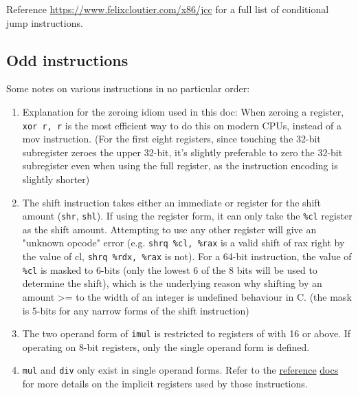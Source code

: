 \documentclass[11pt]{article}
\begin{document}
Reference \href{this link}{https://www.felixcloutier.com/x86/jcc} for a full list of
conditional jump instructions.

\subsection{Odd instructions}

Some notes on various instructions in no particular order:

\begin{enumerate}
    \item Explanation for the zeroing idiom used in this doc: When zeroing a register,
        \texttt{xor r, r} is the most efficient way to do this on modern CPUs, instead of
        a mov instruction. (For the first eight registers, since touching the 32-bit
        subregister zeroes the upper 32-bit, it's slightly preferable to zero the 32-bit
        subregister even when using the full register, as the instruction encoding is
        slightly shorter)

    \item The shift instruction takes either an immediate or register for the shift amount
        (\texttt{shr}, \texttt{shl}). If using the register form, it can only take the
        \texttt{\%cl} register as the shift amount. Attempting to use any other register
        will give an "unknown opcode" error (e.g. \texttt{shrq \%cl, \%rax} is a valid
        shift of rax right by the value of cl, \texttt{shrq \%rdx, \%rax} is not). For a
        64-bit instruction, the value of \texttt{\%cl} is masked to 6-bits (only the
        lowest 6 of the 8 bits will be used to determine the shift), which is the
        underlying reason why shifting by an amount >= to the width of an integer is
        undefined behaviour in C. (the mask is 5-bits for any narrow forms of the shift
        instruction)

    \item The two operand form of \texttt{imul} is restricted to registers of with 16 or
        above. If operating on 8-bit registers, only the single operand form is defined.

    \item \texttt{mul} and \texttt{div} only exist in single operand forms. Refer to the
        \href{https://www.felixcloutier.com/x86/mul}{reference}
        \href{https://www.felixcloutier.com/x86/div}{docs} for more details on the
        implicit registers used by those instructions.


\end{enumerate}
\end{document}
